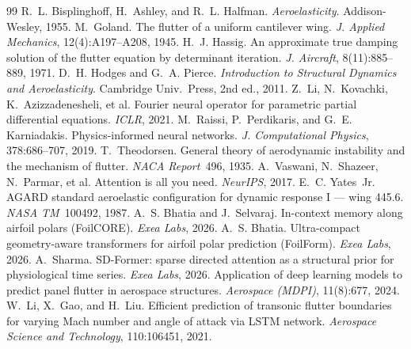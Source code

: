 \documentclass{article}
\begin{document}
\begin{thebibliography}{99}\small
{} R.~L. Bisplinghoff, H.~Ashley, and R.~L. Halfman. \emph{Aeroelasticity}. Addison-Wesley, 1955.
 M.~Goland. The flutter of a uniform cantilever wing. \emph{J. Applied Mechanics}, 12(4):A197--A208, 1945.
 H.~J. Hassig. An approximate true damping solution of the flutter equation by determinant iteration. \emph{J. Aircraft}, 8(11):885--889, 1971.
 D.~H. Hodges and G.~A. Pierce. \emph{Introduction to Structural Dynamics and Aeroelasticity}. Cambridge Univ.\ Press, 2nd ed., 2011.
 Z.~Li, N.~Kovachki, K.~Azizzadenesheli, et al. Fourier neural operator for parametric partial differential equations. \emph{ICLR}, 2021.
 M.~Raissi, P.~Perdikaris, and G.~E. Karniadakis. Physics-informed neural networks. \emph{J. Computational Physics}, 378:686--707, 2019.
 T.~Theodorsen. General theory of aerodynamic instability and the mechanism of flutter. \emph{NACA Report}~496, 1935.
 A.~Vaswani, N.~Shazeer, N.~Parmar, et al. Attention is all you need. \emph{NeurIPS}, 2017.
 E.~C. Yates~Jr. AGARD standard aeroelastic configuration for dynamic response I --- wing 445.6. \emph{NASA TM}~100492, 1987.
 A.~S. Bhatia and J.~Selvaraj. In-context memory along airfoil polars (FoilCORE). \emph{Exea Labs}, 2026.
 A.~S. Bhatia. Ultra-compact geometry-aware transformers for airfoil polar prediction (FoilForm). \emph{Exea Labs}, 2026.
 A.~Sharma. SD-Former: sparse directed attention as a structural prior for physiological time series. \emph{Exea Labs}, 2026.
 Application of deep learning models to predict panel flutter in aerospace structures. \emph{Aerospace (MDPI)}, 11(8):677, 2024.
 W.~Li, X.~Gao, and H.~Liu. Efficient prediction of transonic flutter boundaries for varying Mach number and angle of attack via LSTM network. \emph{Aerospace Science and Technology}, 110:106451, 2021.
\end{thebibliography}
\end{document}
